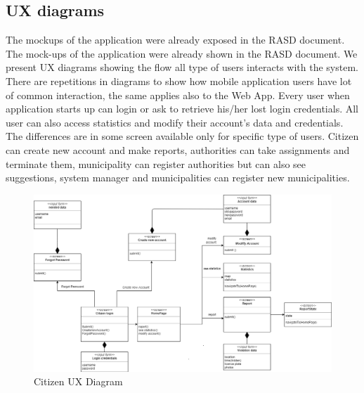 \subsection{UX diagrams}
The mockups of the application were already exposed in the RASD document.
\newline
The mock-ups of the application were already shown in the RASD document.
We present UX diagrams showing the flow all type of users interacts with the system. There are repetitions in diagrams to show how mobile application users have lot of common interaction, the same applies also to the Web App. Every user when application starts up can login or ask to retrieve his/her lost login credentials. All user can also access statistics and modify their account’s data and credentials. The differences are in some screen available only for specific type of users. Citizen can create new account and make reports, authorities can take assignments and terminate them, municipality can register authorities but can also see suggestions, system manager and municipalities can register new municipalities.

\begin{figure}[h]
\centering
\includegraphics[width=\textwidth]{Images/ux1-correct.png}
\caption{\label{fig:ls}Citizen UX Diagram }
\end{figure}


